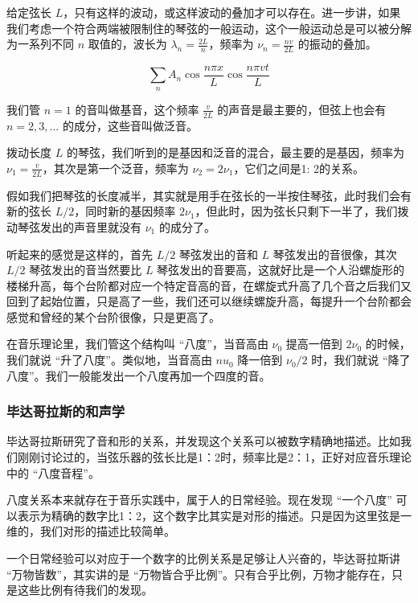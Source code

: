 给定弦长 $L$，只有这样的波动，或这样波动的叠加才可以存在。进一步讲，如果我们考虑一个符合两端被限制住的琴弦的一般运动，这个一般运动总是可以被分解为一系列不同 $n$ 取值的，波长为 $\lambda_n = \frac{2L}{n}$，频率为 $\nu_n = \frac{n v}{2 L }$ 的振动的叠加。

\begin{equation}
\sum\limits_{n} A_n \cos \frac{n \pi x}{L} \cos \frac{n \pi vt}{L}
\end{equation}

我们管 $n = 1$ 的音叫做基音，这个频率 $\frac{v}{2L}$ 的声音是最主要的，但弦上也会有 $n= 2, 3, ...$ 的成分，这些音叫做泛音。

拨动长度 $L$ 的琴弦，我们听到的是基因和泛音的混合，最主要的是基因，频率为 $\nu_1 = \frac{v}{2L} $，其次是第一个泛音，频率为 $\nu_2 = 2 \nu_1$，它们之间是1: 2的关系。

假如我们把琴弦的长度减半，其实就是用手在弦长的一半按住琴弦，此时我们会有新的弦长 $L/2$，同时新的基因频率 $2 \nu_1$，但此时，因为弦长只剩下一半了，我们拨动琴弦发出的声音里就没有 $\nu_1$ 的成分了。

听起来的感觉是这样的，首先 $L/2$ 琴弦发出的音和 $L$ 琴弦发出的音很像，其次 $L/2$ 琴弦发出的音当然要比 $L$ 琴弦发出的音要高，这就好比是一个人沿螺旋形的楼梯升高，每个台阶都对应一个特定音高的音，在螺旋式升高了几个音之后我们又回到了起始位置，只是高了一些，我们还可以继续螺旋升高，每提升一个台阶都会感觉和曾经的某个台阶很像，只是更高了。

在音乐理论里，我们管这个结构叫 “八度”，当音高由 $\nu_0$ 提高一倍到 $2 \nu_0$ 的时候，我们就说 “升了八度”。类似地，当音高由 $nu_0$ 降一倍到 $\nu_0 /2$ 时，我们就说 “降了八度”。我们一般能发出一个八度再加一个四度的音。

\subsubsection{毕达哥拉斯的和声学}

毕达哥拉斯研究了音和形的关系，并发现这个关系可以被数字精确地描述。比如我们刚刚讨论过的，当弦乐器的弦长比是1：2时，频率比是2：1，正好对应音乐理论中的 “八度音程”。

八度关系本来就存在于音乐实践中，属于人的日常经验。现在发现 “一个八度” 可以表示为精确的数字比1：2，这个数字比其实是对形的描述。只是因为这里弦是一维的，我们对形的描述比较简单。

一个日常经验可以对应于一个数字的比例关系是足够让人兴奋的，毕达哥拉斯讲 “万物皆数”，其实讲的是 “万物皆合乎比例”。只有合乎比例，万物才能存在，只是这些比例有待我们的发现。

